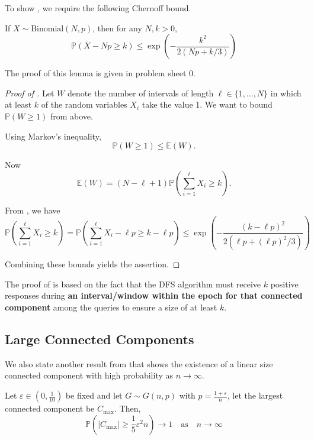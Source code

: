 \documentclass{article}
\begin{document}
To show , we require the following Chernoff bound.  

\begin{lemma}\label{lem:chernoff}
    If $X\sim \text{Binomial}(N,p)$, then for any $N, k >0$,
    \begin{equation*}
        \mathbb{P}(X-N p\geq k)\leq \exp\left(-{\frac{k^{2}}{2(N p+k/3)}}\right)
    \end{equation*}
\end{lemma}

The proof of this lemma is given in problem sheet 0.  

\begin{proof}[Proof of ]
    Let $W$ denote the number of intervals of length $\ell \in \{1, \ldots, N\}$ in which at least $k$ of the random variables $X_i$ take the value 1. We want to bound $\mathbb{P}(W \geq 1)$ from above.

    Using Markov's inequality,
    \[
    \mathbb{P}(W \geq 1) \leq \mathbb{E}(W).
    \]
    
    Now
    \[
    \mathbb{E}(W) = (N - \ell + 1)\mathbb{P}\left(\sum_{i=1}^{\ell} X_i \geq k \right).
    \]
    
    From , we have
    \[
    \mathbb{P}\left(\sum_{i=1}^{\ell} X_i \geq k\right) = \mathbb{P}\left(\sum_{i=1}^{\ell} X_i - \ell p \geq k - \ell p\right) \leq \exp \left(-\frac{(k-\ell p)^2}{2(\ell p+(\ell p)^2/3)}\right)
    \]
    
    Combining these bounds yields the assertion.
\end{proof}


\begin{remark}
    The proof of  is based on the fact that the DFS algorithm must receive $k$ positive responses during \textbf{an interval/window within the epoch for that connected component} among the queries to ensure a size of at least $k$.
\end{remark}


\subsection{Large Connected Components}

We also state another result from \citep{krivelevich2012phase} that shows the existence of a linear size connected component with high probability as $n\to \infty$.  

\begin{theorem}
    Let $\varepsilon \in (0,\frac{1}{10})$ be fixed and let $G\sim G(n,p)$ with $p=\frac{1+\varepsilon}{n}$, let the largest connected component be $C_{\max}$. Then,
    \begin{equation*}
        \mathbb{P}(|C_{\max}|\geq \frac{1}{5}\varepsilon^2 n)\to 1 \quad \text{as} \quad n\to \infty
    \end{equation*}
\end{theorem}
\end{document}

